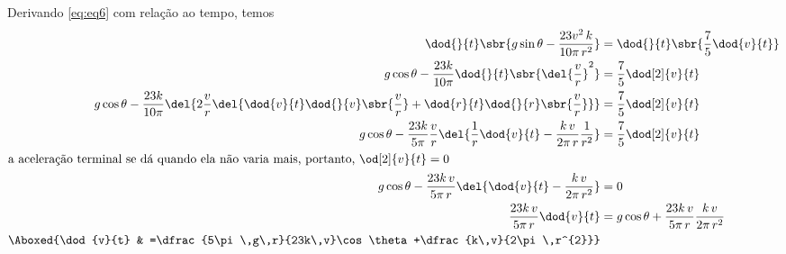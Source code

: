 \documentclass[]{IMTexam}
\begin{document}
\begin{questions}
\begin{parts}
		\begin{solution}
			Derivando \ref{eq:eq6} com relação ao tempo, temos
			\begin{align*}
				\dod{}{t}\sbr{g\sin\theta-\dfrac{23v^{2}\,k}{10\pi\,r^{2}}}                                                                        & =\dod{}{t}\sbr{\dfrac{7}{5}\dod{v}{t}}                           \\
				g\cos\theta-\dfrac{23k}{10\pi}\dod{}{t}\sbr{\del{\dfrac{v}{r}}^{2}}                                                                & =\dfrac{7}{5}\dod[2]{v}{t}                                       \\
				g\cos\theta-\dfrac{23k}{10\pi}\del{2\dfrac{v}{r}\del{\dod{v}{t}\dod{}{v}\sbr{\dfrac{v}{r}}+\dod{r}{t}\dod{}{r}\sbr{\dfrac{v}{r}}}} & =\dfrac{7}{5}\dod[2]{v}{t}                                       \\
				g\cos\theta-\dfrac{23k}{5\pi}\dfrac{v}{r}\del{\dfrac{1}{r}\dod{v}{t}-\dfrac{k\,v}{2\pi\,r}\dfrac{1}{r^{2}}}                        & =\dfrac{7}{5}\dod[2]{v}{t}                                       \\
				\intertext{a aceleração terminal se dá quando ela não varia mais, portanto, $ \od[2]{v}{t}=0 $}
				g\cos\theta-\dfrac{23k\,v}{5\pi\,r}\del{\dod{v}{t}-\dfrac{k\,v}{2\pi\,r^{2}}}                                                      & =0                                                               \\
				\dfrac{23k\,v}{5\pi\,r}\dod{v}{t}                                                                                                  & =g\cos\theta+\dfrac{23k\,v}{5\pi\,r}\dfrac{k\,v}{2\pi\,r^{2}}    \\
				\Aboxed{\dod{v}{t}                                                                                                                 & =\dfrac{5\pi\,g\,r}{23k\,v}\cos\theta+\dfrac{k\,v}{2\pi\,r^{2}}}
			\end{align*}
		\end{solution}
	\end{parts}


\end{questions}
\end{document}
